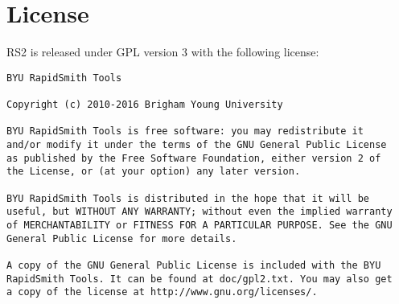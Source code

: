 \newpage
\section{License}
RS2 is released under GPL version 3 with the following license: 

\begin{verbatim}
BYU RapidSmith Tools

Copyright (c) 2010-2016 Brigham Young University
   
BYU RapidSmith Tools is free software: you may redistribute it
and/or modify it under the terms of the GNU General Public License
as published by the Free Software Foundation, either version 2 of
the License, or (at your option) any later version.
   
BYU RapidSmith Tools is distributed in the hope that it will be
useful, but WITHOUT ANY WARRANTY; without even the implied warranty
of MERCHANTABILITY or FITNESS FOR A PARTICULAR PURPOSE. See the GNU
General Public License for more details.
   
A copy of the GNU General Public License is included with the BYU
RapidSmith Tools. It can be found at doc/gpl2.txt. You may also get
a copy of the license at http://www.gnu.org/licenses/.
\end{verbatim}